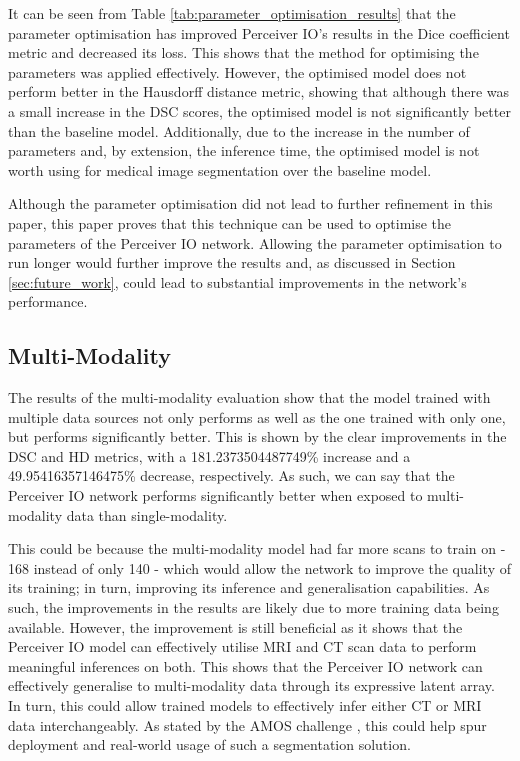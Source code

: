 \documentclass{l4proj}
\begin{document}
It can be seen from Table \ref{tab:parameter_optimisation_results} that the parameter optimisation has improved Perceiver IO’s results in the Dice coefficient metric and decreased its loss. This shows that the method for optimising the parameters was applied effectively. However, the optimised model does not perform better in the Hausdorff distance metric, showing that although there was a small increase in the DSC scores, the optimised model is not significantly better than the baseline model. Additionally, due to the increase in the number of parameters and, by extension, the inference time, the optimised model is not worth using for medical image segmentation over the baseline model.

Although the parameter optimisation did not lead to further refinement in this paper, this paper proves that this technique can be used to optimise the parameters of the Perceiver IO network. Allowing the parameter optimisation to run longer would further improve the results and, as discussed in Section \ref{sec:future_work}, could lead to substantial improvements in the network’s performance.

\subsection{Multi-Modality}

The results of the multi-modality evaluation show that the model trained with multiple data sources not only performs as well as the one trained with only one, but performs significantly better. This is shown by the clear improvements in the DSC and HD metrics, with a \num{181.2373504487749}\% increase and a \num{49.95416357146475}\% decrease, respectively. As such, we can say that the Perceiver IO network performs significantly better when exposed to multi-modality data than single-modality.

This could be because the multi-modality model had far more scans to train on - 168 instead of only 140 - which would allow the network to improve the quality of its training; in turn, improving its inference and generalisation capabilities. As such, the improvements in the results are likely due to more training data being available. However, the improvement is still beneficial as it shows that the Perceiver IO model can effectively utilise MRI and CT scan data to perform meaningful inferences on both. This shows that the Perceiver IO network can effectively generalise to multi-modality data through its expressive latent array. In turn, this could allow trained models to effectively infer either CT or MRI data interchangeably. As stated by the AMOS challenge \citep{ji2022amos}, this could help spur deployment and real-world usage of such a segmentation solution. 
\end{document}
